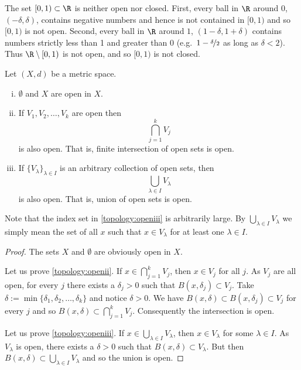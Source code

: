 \documentclass[12pt]{book}
\begin{document}
\begin{example}
The set $[0,1) \subset \R$ is neither open nor closed.
First,
every ball in $\R$ around $0$, $(-\delta,\delta)$, contains negative
numbers and hence is not contained in $[0,1)$ and so $[0,1)$ is not open.
Second, every ball in $\R$ around $1$, $(1-\delta,1+\delta)$ contains
numbers strictly less than 1 and greater than 0
(e.g.\ $1-\nicefrac{\delta}{2}$ as long as $\delta < 2$).
Thus $\R \setminus
[0,1)$ is not open, and so $[0,1)$ is not closed.
\end{example}

\begin{prop} \label{prop:topology:open}
Let $(X,d)$ be a metric space.
\begin{enumerate}[(i)]
\item \label{topology:openi} $\emptyset$ and $X$ are open in $X$.
\item \label{topology:openii} If $V_1, V_2, \ldots, V_k$ are open then
\begin{equation*}
\bigcap_{j=1}^k V_j
\end{equation*}
is also open.
That is, finite intersection of open sets is open.
\item \label{topology:openiii} If $\{ V_\lambda \}_{\lambda \in I}$ is
an arbitrary collection of open sets, then
\begin{equation*}
\bigcup_{\lambda \in I} V_\lambda
\end{equation*}
is also open.
That is, union of open sets is open.
\end{enumerate}
\end{prop}

Note that the index set in \ref{topology:openiii} is arbitrarily large.
By $\bigcup_{\lambda \in I} V_\lambda$ we simply mean the set of
all $x$ such that $x \in V_\lambda$ for at least one $\lambda \in I$.

\begin{proof}
The sets $X$ and $\emptyset$ are obviously open in $X$.

Let us prove \ref{topology:openii}.
If $x \in \bigcap_{j=1}^k V_j$, then $x \in V_j$ for all $j$.
As $V_j$ are all open, for every $j$ there exists a $\delta_j > 0$ 
such that $B(x,\delta_j) \subset V_j$.
Take $\delta := \min \{
\delta_1,\delta_2,\ldots,\delta_k \}$ and notice $\delta > 0$.
We have
$B(x,\delta) \subset B(x,\delta_j) \subset V_j$ for every $j$ and so
$B(x,\delta) \subset \bigcap_{j=1}^k V_j$.
Consequently the intersection is open.

Let us prove \ref{topology:openiii}.
If $x \in \bigcup_{\lambda \in I} V_\lambda$, then $x \in V_\lambda$ for some
$\lambda \in I$.
As $V_\lambda$ is open, there exists a $\delta > 0$
such that $B(x,\delta) \subset V_\lambda$.
But then
$B(x,\delta) \subset \bigcup_{\lambda \in I} V_\lambda$
and so the union is open.
\end{proof}
\end{document}
